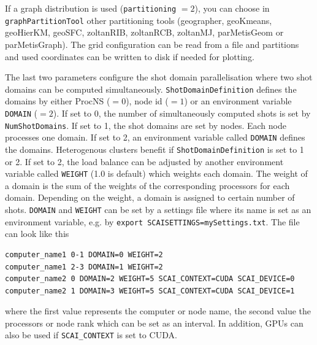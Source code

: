 \documentclass[pdftex,a4paper,parskip,listof=totoc,bibliography=totoc,onehalfspacing,12pt]{scrreprt}
\newcommand{\shellcmd}[1]{\indent\indent\texttt{#1}}	%
\begin{document}
If a graph distribution is used (\verb+partitioning+ $=2$), you can choose in \verb+graphPartitionTool+ other partitioning tools (geographer, geoKmeans, geoHierKM, geoSFC, zoltanRIB, zoltanRCB, zoltanMJ, parMetisGeom or parMetisGraph).
The grid configuration can be read from a file and partitions and used coordinates can be written to disk if needed for plotting.

The last two parameters configure the shot domain parallelisation where two shot domains can be computed simultaneously. 
\verb+ShotDomainDefinition+ defines the domains by either ProcNS ($=0$), node id ($=1$) or an environment variable \shellcmd{DOMAIN} ($=2$).
If set to 0, the number of simultaneously computed shots is set by \verb+NumShotDomains+. If set to 1, the shot domains are set by nodes. Each node processes one domain. If set to 2, an environment variable called \shellcmd{DOMAIN} defines the domains.
Heterogenous clusters benefit if \verb+ShotDomainDefinition+ is set to 1 or 2. If set to 2, the load balance can be adjusted by another environment variable called \shellcmd{WEIGHT} (1.0 is default) which weights each domain. 
The weight of a domain is the sum of the weights of the corresponding processors for each domain. Depending on the weight, a domain is assigned to certain number of shots.
\shellcmd{DOMAIN} and \shellcmd{WEIGHT} can be set by a settings file where its name is set as an environment variable, e.g. by \shellcmd{export SCAISETTINGS=mySettings.txt}.
The file can look like this 
\begin{verbatim}
computer_name1 0-1 DOMAIN=0 WEIGHT=2
computer_name1 2-3 DOMAIN=1 WEIGHT=2
computer_name2 0 DOMAIN=2 WEIGHT=5 SCAI_CONTEXT=CUDA SCAI_DEVICE=0
computer_name2 1 DOMAIN=3 WEIGHT=5 SCAI_CONTEXT=CUDA SCAI_DEVICE=1
\end{verbatim}
where the first value represents the computer or node name, the second value the processors or node rank which can be set as an interval. In addition, GPUs can also be used if \shellcmd{SCAI\_CONTEXT} is set to CUDA.
\end{document}
